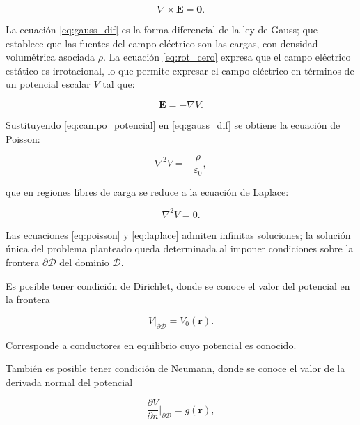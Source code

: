 \documentclass[12pt, twocolumn]{article}
\begin{document}
\begin{equation}
    \nabla \times \mathbf{E} = \mathbf{0}. \label{eq:rot_cero}
\end{equation}

La ecuación \ref{eq:gauss_dif} es la forma diferencial de la ley de Gauss; que establece que las fuentes del campo eléctrico son las cargas, con densidad volumétrica asociada $\rho$. La ecuación \ref{eq:rot_cero} expresa que el campo eléctrico estático es irrotacional, lo que permite expresar el campo eléctrico en términos de un potencial escalar $V$ tal que:

\begin{equation}
    \mathbf{E} = -\nabla V.
    \label{eq:campo_potencial}
\end{equation}

Sustituyendo \ref{eq:campo_potencial} en \ref{eq:gauss_dif} se obtiene la ecuación de Poisson:

\begin{equation}
    \nabla^2 V = -\frac{\rho}{\varepsilon_0},
    \label{eq:poisson}
\end{equation}

que en regiones libres de carga se reduce a la ecuación de Laplace:

\begin{equation}
    \nabla^2 V = 0.
    \label{eq:laplace}
\end{equation}

Las ecuaciones \ref{eq:poisson} y \ref{eq:laplace} admiten infinitas soluciones; la solución única del problema planteado queda determinada al imponer condiciones sobre la frontera $\partial\mathcal{D}$ del dominio $\mathcal{D}$.

Es posible tener condición de Dirichlet, donde se conoce el valor del potencial en la frontera

\begin{equation}
        V\big|_{\partial\mathcal{D}} = V_0(\mathbf{r}).
        \label{eq:dirichlet}
    \end{equation}

Corresponde a conductores en equilibrio cuyo potencial es conocido.

También es posible tener condición de Neumann, donde se conoce el valor de la derivada normal del potencial

\begin{equation}
        \frac{\partial V}{\partial n}\bigg|_{\partial\mathcal{D}} = g(\mathbf{r}),
        \label{eq:neumann}
    \end{equation}
\end{document}
